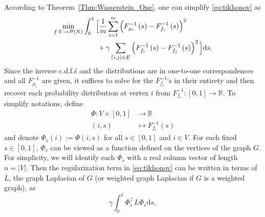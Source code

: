 \documentclass[letterpaper]{article} %
\begin{document}
According to  Theorem~\ref{Thm:Wasserstein_One}, one can simplify \eqref{eq:tikhonov} as 
\begin{equation*}
  \begin{aligned}
    \min_{f:V\to \P(N)}&\int_0^1 \Big[ \frac{1}{m} \sum_{i=1}^m \left(F_{\mu_i}^{-1}\left( s \right)-F_{f_i}^{-1}\left( s \right)\right)^2\\
    &\qquad +\gamma \sum_{\left( i,j \right)\in E}\left( F_{f_i}^{-1}\left( s \right)-F_{f_j}^{-1}\left( s \right) \right)^2  \Big]\mathrm{d}s.
  \end{aligned}
  \end{equation*}
Since the inverse c.d.f.\'s and the distributions are in one-to-one correspondences and all $F_{\mu_i}^{-1}$ are given, it suffices to solve for the $F_{f_i}^{-1}$'s in their entirety and then recover each probability distribution at vertex $i$ from $F_{f_i}^{-1}:[0,1]\rightarrow\mathbb{R}$. To simplify notations, define
\begin{equation*}
  \begin{aligned}
    \Phi:V\times \left[ 0,1 \right]&\rightarrow \mathbb{R}\\
    \left( i,s \right)&\mapsto F_{f_i}^{-1}\left( s \right)
  \end{aligned}
\end{equation*}
and denote $\Phi_s \left( i \right):=\Phi \left( i,s \right)$ for all $s\in \left[ 0,1 \right]$ and $i\in V$.
For each fixed $s\in\left[0,1\right]$, $\Phi_s$ can be viewed as a function defined on the vertices of the graph $G$. For simplicity, we will identify each $\Phi_s$ with a real column vector of length $n=\left| V \right|$. 
Then the regularization term in \eqref{eq:tikhonov} can be written in terms of $L$, the graph Laplacian of $G$ (or weighted graph Laplacian if $G$ is a weighted graph), as
\begin{equation*}
  \gamma\int_0^1\Phi_s^{\top}L\Phi_s\mathrm{d}s,
\end{equation*}
\end{document}
